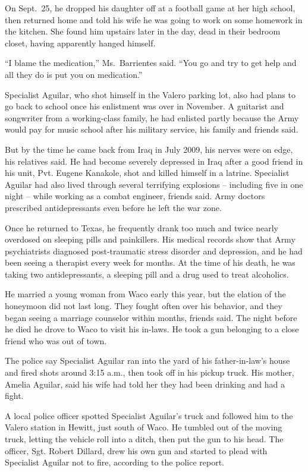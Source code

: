 ﻿\documentclass[12pt]{article}
\begin{document}
On Sept.~25, he dropped his daughter off at a football game at her high school, then returned home
and told his wife he was going to work on some homework in the kitchen. She found him upstairs later
in the day, dead in their bedroom closet, having apparently hanged himself.

``I blame the medication,'' Ms.~Barrientes said. ``You go and try to get help and all they do is put
you on medication.''

Specialist Aguilar, who shot himself in the Valero parking lot, also had plans to go back to school
once his enlistment was over in November. A guitarist and songwriter from a working-class family, he
had enlisted partly because the Army would pay for music school after his military service, his
family and friends said.

But by the time he came back from Iraq in July 2009, his nerves were on edge, his relatives said. He
had become severely depressed in Iraq after a good friend in his unit, Pvt. Eugene Kanakole, shot
and killed himself in a latrine. Specialist Aguilar had also lived through several terrifying
explosions -- including five in one night -- while working as a combat engineer, friends said. Army
doctors prescribed antidepressants even before he left the war zone.

Once he returned to Texas, he frequently drank too much and twice nearly overdosed on sleeping pills
and painkillers. His medical records show that Army psychiatrists diagnosed post-traumatic stress
disorder and depression, and he had been seeing a therapist every week for months. At the time of
his death, he was taking two antidepressants, a sleeping pill and a drug used to treat alcoholics.

He married a young woman from Waco early this year, but the elation of the honeymoon did not last
long. They fought often over his behavior, and they began seeing a marriage counselor within months,
friends said. The night before he died he drove to Waco to visit his in-laws. He took a gun
belonging to a close friend who was out of town.

The police say Specialist Aguilar ran into the yard of his father-in-law's house and fired shots
around 3:15 a.m., then took off in his pickup truck. His mother, Amelia Aguilar, said his wife had
told her they had been drinking and had a fight.

A local police officer spotted Specialist Aguilar's truck and followed him to the Valero station in
Hewitt, just south of Waco. He tumbled out of the moving truck, letting the vehicle roll into a
ditch, then put the gun to his head. The officer, Sgt. Robert Dillard, drew his own gun and started
to plead with Specialist Aguilar not to fire, according to the police report.
\end{document}
